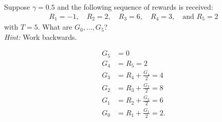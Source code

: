 
\begin{exercise}[Exercise 3.8]

Suppose $\gamma = 0.5$ and the following sequence of rewards is received:
\begin{align*}
  R_1 = -1, \quad R_2 = 2, \quad R_3 = 6, \quad R_4 = 3, \quad \text{and } R_5 = 2
\end{align*}
with $T = 5$. What are $G_0, \dots, G_5$? \\
\textit{Hint:} Work backwards.

\end{exercise}


\begin{solution}

\begin{align*}
  G_5 &= 0 \\
  G_4 &= R_5 = 2 \\
  G_3 &= R_4 + \frac{G_4}{2} = 4 \\
  G_2 &= R_3 + \frac{G_3}{2} = 8 \\
  G_1 &= R_2 + \frac{G_2}{2} = 6 \\
  G_0 &= R_1 + \frac{G_1}{2} = 2.
\end{align*}

\end{solution}

